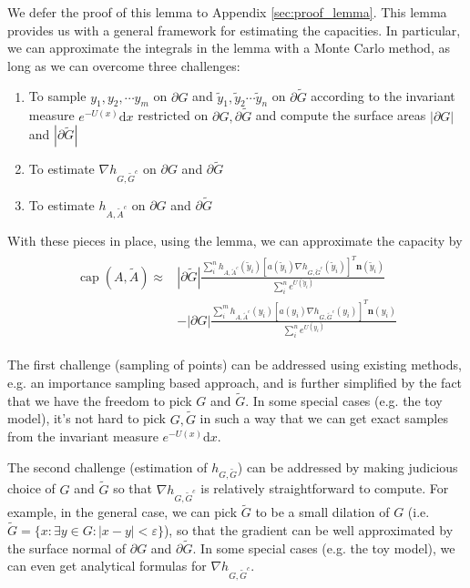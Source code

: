 \documentclass[english, aip, jcp, priprint, graphicx]{revtex4-1}
\theoremstyle{plain}
\theoremstyle{definition}
\theoremstyle{plain}
\begin{document}
We defer the proof of this lemma to Appendix \ref{sec:proof_lemma}. This lemma provides us with a general framework for estimating the capacities.   In particular, we can approximate the integrals in the lemma with a Monte Carlo method, as long as we can overcome three challenges:
\begin{enumerate}
	\item To sample $y_1,y_2,\cdots y_m$ on $\partial G$ and $\tilde y_1,\tilde y_2 \cdots \tilde y_n$ on $\partial \tilde{G}$ according to the invariant measure $e^{- U(x)}\mathrm{d}x$ restricted on $\partial G, \partial \tilde{G}$ and compute the surface areas $|\partial G|$ and $|\partial \tilde G|$

\item To estimate $\nabla h_{G, \tilde{G}^c}$ on $\partial G$ and
$\partial \tilde{G}$

\item To estimate $h_{A, \tilde{A}^c}$ on $\partial G$ and $\partial
\tilde{G}$
\end{enumerate}
With these pieces in place, using the lemma, we can approximate the capacity by
\begin{gather}\label{eq:capesteq}
\begin{array}{cc}
\ensuremath{\operatorname{cap}} (A, \tilde{A}) \approx & 
|\partial \tilde G|\frac{\sum_i^n h_{A,\tilde A^c}(\tilde y_i)[a(\tilde y_i)\nabla h_{G,\tilde G^c}(\tilde y_i)]^T \textbf{n}(\tilde y_i)}{\sum_i^n e^{U(\tilde y_i)}} \\
& - |\partial G|\frac{\sum_i^m h_{A,\tilde A^c}(y_i)[a(y_i)\nabla h_{G,\tilde G^c}(y_i)]^T \textbf{n}(y_i)}{\sum_i^n e^{U(y_i)}} 
\end{array}
\end{gather}

The first challenge (sampling of points) can be addressed using existing methods, e.g. an importance sampling based approach, and is further simplified by the fact that we have the freedom to pick $G$ and $\tilde{G}$. In some special cases (e.g. the toy model), it's not hard to pick $G, \tilde{G}$ in such a way that we can get exact samples from the invariant measure $e^{- U (x)} \mathrm{d} x$.

The second challenge (estimation of $h_{G,\tilde G}$) can be addressed by making judicious choice of $G$ and
$\tilde{G}$ so that $\nabla h_{G, \tilde{G}^c}$ is relatively straightforward
to compute. For example, in the general case, we can pick $\tilde{G}$ to be a
small dilation of $G$ (i.e. $\tilde{G} = \{ x : \exists y \in G : | x - y | <
\varepsilon \}$), so that the gradient can be well approximated by the surface
normal of $\partial G$ and $\partial \tilde{G}$. In some special cases (e.g.
the toy model), we can even get analytical formulas for $\nabla h_{G,
\tilde{G}^c}$.
\end{document}
